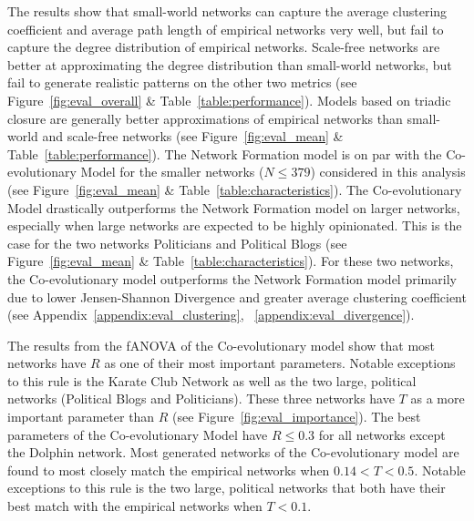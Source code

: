 \documentclass[11pt]{article}
\begin{document}
The results show that small-world networks can capture the average clustering coefficient and average path length of empirical networks very well, but fail to capture the degree distribution of empirical networks. Scale-free networks are better at approximating the degree distribution than small-world networks, but fail to generate realistic patterns on the other two metrics (see Figure~\ref{fig:eval_overall} \& Table~\ref{table:performance}). Models based on triadic closure are generally better approximations of empirical networks than small-world and scale-free networks (see Figure~\ref{fig:eval_mean} \& Table~\ref{table:performance}). The Network Formation model is on par with the Co-evolutionary Model for the smaller networks ($N\leq 379$) considered in this analysis (see Figure~\ref{fig:eval_mean} \& Table~\ref{table:characteristics}). The Co-evolutionary Model drastically outperforms the Network Formation model on larger networks, especially when large networks are expected to be highly opinionated. This is the case for the two networks Politicians and Political Blogs (see Figure~\ref{fig:eval_mean} \& Table~\ref{table:characteristics}). For these two networks, the Co-evolutionary model outperforms the Network Formation model primarily due to lower Jensen-Shannon Divergence and greater average clustering coefficient (see Appendix~\ref{appendix:eval_clustering}, ~\ref{appendix:eval_divergence}).  

\noindent The results from the fANOVA of the Co-evolutionary model show that most networks have $R$ as one of their most important parameters. Notable exceptions to this rule is the Karate Club Network as well as the two large, political networks (Political Blogs and Politicians). These three networks have $T$ as a more important parameter than $R$ (see Figure~\ref{fig:eval_importance}).
The best parameters of the Co-evolutionary Model have $R\leq0.3$ for all networks except the Dolphin network. Most generated networks of the Co-evolutionary model are found to most closely match the empirical networks when $0.14 < T < 0.5$. Notable exceptions to this rule is the two large, political networks that both have their best match with the empirical networks when $T < 0.1$. 
\end{document}
